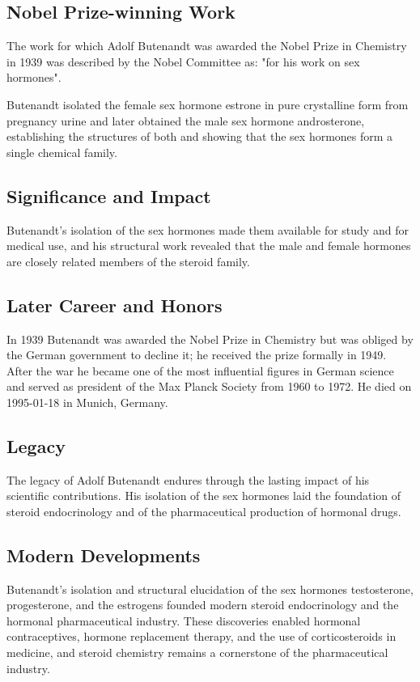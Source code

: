 \subsection*{Nobel Prize-winning Work}

The work for which Adolf Butenandt was awarded the Nobel Prize in Chemistry in 1939 was described by the Nobel Committee as: "for his work on sex hormones".

Butenandt isolated the female sex hormone estrone in pure crystalline form from pregnancy urine and later obtained the male sex hormone androsterone, establishing the structures of both and showing that the sex hormones form a single chemical family.

\subsection*{Significance and Impact}

Butenandt's isolation of the sex hormones made them available for study and for medical use, and his structural work revealed that the male and female hormones are closely related members of the steroid family.

\subsection*{Later Career and Honors}

In 1939 Butenandt was awarded the Nobel Prize in Chemistry but was obliged by the German government to decline it; he received the prize formally in 1949.
After the war he became one of the most influential figures in German science and served as president of the Max Planck Society from 1960 to 1972.
He died on 1995-01-18 in Munich, Germany.

\subsection*{Legacy}

The legacy of Adolf Butenandt endures through the lasting impact of his scientific contributions.
His isolation of the sex hormones laid the foundation of steroid endocrinology and of the pharmaceutical production of hormonal drugs.

\subsection*{Modern Developments}

Butenandt's isolation and structural elucidation of the sex hormones testosterone, progesterone, and the estrogens founded modern steroid endocrinology and the hormonal pharmaceutical industry. These discoveries enabled hormonal contraceptives, hormone replacement therapy, and the use of corticosteroids in medicine, and steroid chemistry remains a cornerstone of the pharmaceutical industry.


